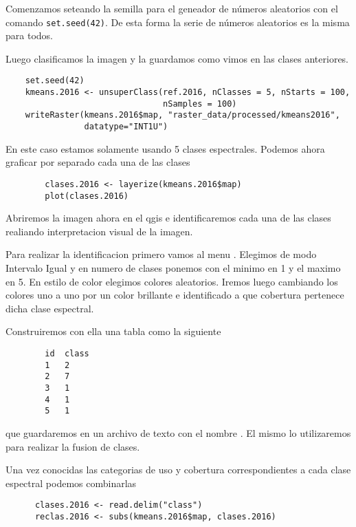 \begin{exa}
    Comenzamos seteando la semilla para el geneador de n\'umeros aleatorios con el
    comando \texttt{set.seed(42)}. De esta forma la serie de n\'umeros aleatorios
    es la misma para todos.

    Luego clasificamos la imagen y la guardamos como vimos en las clases anteriores.
    \begin{lstlisting}
    set.seed(42)
    kmeans.2016 <- unsuperClass(ref.2016, nClasses = 5, nStarts = 100,
                                nSamples = 100)
    writeRaster(kmeans.2016$map, "raster_data/processed/kmeans2016",
                datatype="INT1U")
    \end{lstlisting}

    En este caso estamos solamente usando 5 clases espectrales. Podemos ahora graficar por separado cada una de las clases
    \begin{lstlisting}
        clases.2016 <- layerize(kmeans.2016$map)
        plot(clases.2016)
    \end{lstlisting}

    Abriremos la imagen ahora en el qgis e identificaremos cada una de las clases
    realiando interpretacion visual de la imagen.

    Para realizar la identificacion primero vamos al menu . Elegimos de modo
    Intervalo Igual y en numero de clases ponemos con el minimo en 1 y el maximo en
    5. En estilo de color elegimos colores aleatorios. Iremos luego cambiando los
    colores uno a uno por un color brillante e identificado a que cobertura
    pertenece dicha clase espectral.

    Construiremos con ella una tabla como la siguiente

    \begin{verbatim}
        id  class
        1   2
        2   7
        3   1
        4   1
        5   1
    \end{verbatim}

  que guardaremos en un archivo de texto con el nombre . El mismo lo utilizaremos para realizar
  la fusion de clases.

  Una vez conocidas las categorias de uso y cobertura correspondientes a cada
  clase espectral podemos combinarlas

  \begin{lstlisting}
      clases.2016 <- read.delim("class")
      reclas.2016 <- subs(kmeans.2016$map, clases.2016)
  \end{lstlisting}

\end{exa}

